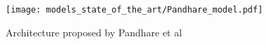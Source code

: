 \begin{figure}[H]
  \centering
  \texttt{[image: models\_state\_of\_the\_art/Pandhare\_model.pdf]}
  \caption{Architecture proposed by Pandhare et al \cite{Pandhare2021}}
  \label{fig:Pandhare_model}
\end{figure}


\begin{comment}
\subsection{Domain Conditioned Adaptation Network}
Most domain adaption approaches reduce the domain discrepancy in task-specific layers but use a shared feature extractor backbone across all domains. Li et al \cite{li2020} assume that, if the domain discrepancy is tremendously large, these methods can only reduce the domain discrepancy, but not fundamentally eliminate it. In the proposed Domain Conditioned Adaptation Network (DCAN) Li et al present some alternative and more effectively domain adaptive approach. Li et al recommend to extract domain-specific and -independent features in the feature extractor backbone. Since the source and target domains are correlated to some extend, the network itself can extract domain-independent features. The powerful feature extractor learned from the source domain can also increase the model performance on the target domain. At the same time, features which are too sensitive to the source domain can even reduce the model performance on the target domain. To counteract that phenomena, Li et al recommend to additionally extract domain-specific features in the convolutional layers. This can improve the cross-domain feature alignment in the task-specific layers. A domain conditioned feature correction module is applied to reduce the domain discrepancy in the extracted domain-specific and -independent features. Additionally, the model is optimized with a conventional supervised source and a newly proposed unsupervised target CE-loss defined as following:

\begin{equation}
    \min_{G} L_{s} = -\frac{1}{n_{t}} \sum_{j=1}^{n_{t}} \sum_{k=1}^{C_{n}} G^{(k)}(\pmb{x}_{tj})logG^{(k)}(\pmb{x}_{tj}),
\end{equation}
where $G(\cdot)$ is the learned predictive model, $n_{t}$ the number of source domain samples, $C_{n}$ the classes present in source and target domain and $\pmb{x}_{t}$ the target samples. The presented model is developed for computer vision applications and is never been evaluated in the context of PHM. Since PHM suffers from similar problems, this approach might be relevant and interesting for the PHM community. The model is visualized in fig. \ref{fig:DCAN_model}. In the following, the two domain adaption modules are described in more detail \cite{li2020}. 


\end{comment}

